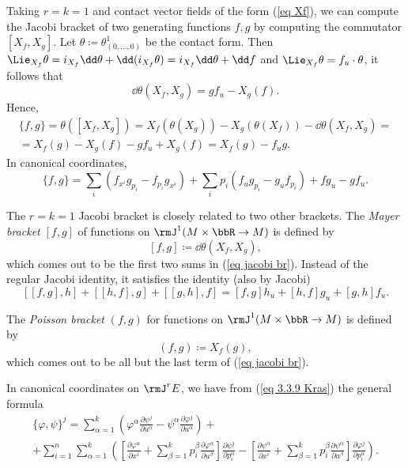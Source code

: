 \begin{example}
    Taking $r=k=1$ and contact vector fields of the form (\ref{eq Xf}), we can compute the Jacobi bracket of two generating functions $f,g$ by computing the commutator $[X_f,X_g]$. Let $\theta\coloneqq \theta^1_{(0,\ldots,0)}$ be the contact form. Then $\Lie_{X_f}\theta=i_{X_f}\dd\theta+\dd(i_{X_f}\theta)=i_{X_f}\dd\theta+\dd f$ and $\Lie_{X_f}\theta=f_u\cdot \theta$, it follows that 
    \[\dd \theta(X_f,X_g)=gf_u-X_g(f).\]
    Hence, 
    \begin{multline}
        \{f,g\}=\theta([X_f,X_g])=X_f(\theta(X_g))-X_g(\theta(X_f))-\dd\theta(X_f,X_g)=\\=X_f(g)-X_g(f)-gf_u+X_g(f)=X_f(g)-f_u g.
    \end{multline}
    In canonical coordinates, 
    \[\{f,g\}=\sum_i \left(f_{x^i}g_{p_i}-f_{p_i}g_{x^i}\right)+\sum_i p_i\left(f_u g_{p_i}-g_uf_{p_i}\right)+fg_u-gf_u.\label{eq jacobi br}\]
\end{example}

\begin{rem}
    The $r=k=1$ Jacobi bracket is closely related to two other brackets. The \emph{Mayer bracket} $[f,g]$ of functions on $\rmJ^1 (M\times\bbR\to M)$ is defined by 
    \[[f,g]\coloneqq \dd\theta(X_f,X_g),\]
    which comes out to be the first two sums in (\ref{eq jacobi br}). Instead of the regular Jacobi identity, it satisfies the identity (also by Jacobi)
    \[[[f,g],h]+[[h,f],g]+[[g,h],f]=[f,g]h_u+[h,f]g_u+[g,h]f_u.\]

    The \emph{Poisson bracket} $(f,g)$ for functions on $\rmJ^1(M\times \bbR\to M)$ is defined by 
    \[(f,g)\coloneqq X_f(g),\]
    which comes out to be all but the last term of (\ref{eq jacobi br}). 
\end{rem}


In canonical coordinates on $\rmJ^rE$, we have from (\ref{eq 3.3.9 Kras}) the general formula
\begin{multline}
    \{\varphi,\psi\}^j=\sum_{\alpha=1}^k\left(\varphi^\alpha\frac{\partial\psi^j}{\partial u^\alpha}-\psi^\alpha \frac{\partial \varphi^j}{\partial u^\alpha}\right)+\\ 
    +\sum_{i=1}^n\sum_{\alpha=1}^k \left(\left[\frac{\partial\varphi^\alpha}{\partial x^i}+\sum_{\beta=1}^k p^\beta_i\frac{\partial \varphi^\alpha}{\partial u^\beta}\right]\frac{\partial \psi^j}{\partial p^\alpha_i}-
    \left[\frac{\partial \psi^\alpha}{\partial x^i}+\sum_{\beta=1}^k p^\beta_i\frac{\partial \psi^\alpha}{\partial u^\beta}\right]\frac{\partial \varphi^j}{\partial p^\alpha_i}
    \right).\label{eq ex 3.3.7 Kras}
\end{multline}

